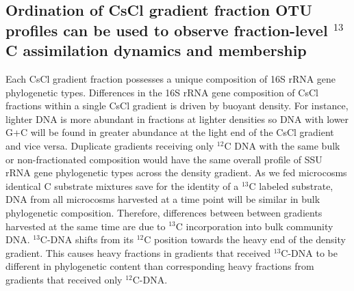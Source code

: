 \subsection{Ordination of CsCl gradient fraction OTU profiles can be used to
observe fraction-level $^{13}$C assimilation dynamics and membership}
Each CsCl gradient fraction possesses a unique composition of 16S rRNA gene
phylogenetic types. Differences in the 16S rRNA gene composition of CsCl
fractions within a single CsCl gradient is driven by buoyant density. For
instance, lighter DNA is more abundant in fractions at lighter densities so
DNA with lower G+C will be found in greater abundance at the light end of the
CsCl gradient and vice versa.  Duplicate gradients receiving only $^{12}$C DNA
with the same bulk or non-fractionated composition would have the same overall
profile of SSU rRNA gene phylogenetic types across the density gradient. As we
fed microcosms identical C substrate mixtures save for the
identity of a $^{13}$C labeled substrate, DNA from all microcosms harvested at
a time point will be similar in bulk phylogenetic composition. Therefore,
differences between between gradients harvested at the same time are due to
$^{13}$C incorporation into bulk community DNA. $^{13}$C-DNA shifts from its
$^{12}$C position towards the heavy end of the density gradient. This causes
heavy fractions in gradients that received $^{13}$C-DNA to be different in 
phylogenetic content than corresponding heavy fractions from gradients that
received only $^{12}$C-DNA.

